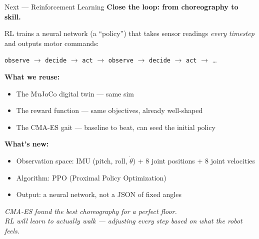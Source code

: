 \documentclass[aspectratio=169]{beamer}
\begin{document}
\begin{frame}{Next --- Reinforcement Learning}
\textbf{Close the loop: from choreography to skill.}

\vspace{0.5em}
RL trains a neural network (a ``policy'') that takes sensor readings \emph{every timestep} and outputs motor commands:

\vspace{0.3em}
\centering
\texttt{observe} $\to$ \texttt{decide} $\to$ \texttt{act} $\to$ \texttt{observe} $\to$ \texttt{decide} $\to$ \texttt{act} $\to$ \ldots

\vspace{0.5em}
\raggedright
\textbf{What we reuse:}
\begin{itemize}
    \item The MuJoCo digital twin --- same sim
    \item The reward function --- same objectives, already well-shaped
    \item The CMA-ES gait --- baseline to beat, can seed the initial policy
\end{itemize}

\textbf{What's new:}
\begin{itemize}
    \item Observation space: IMU (pitch, roll, $\dot{\theta}$) + 8 joint positions + 8 joint velocities
    \item Algorithm: PPO (Proximal Policy Optimization)
    \item Output: a neural network, not a JSON of fixed angles
\end{itemize}

\vspace{0.3em}
\emph{CMA-ES found the best choreography for a perfect floor.\\
RL will learn to actually walk --- adjusting every step based on what the robot feels.}
\end{frame}
\end{document}
